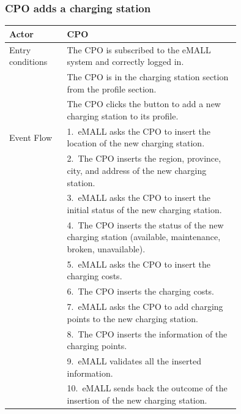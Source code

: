 \subsubsection*{CPO adds a charging station}
\begin{center}
    \begin{longtable}{lp{0.75\linewidth}}
        \hline
        Actor            & CPO                                                                                                       \\
        \hline
        Entry conditions & The CPO is subscribed to the eMALL system and correctly logged in.                                        \\
        & The CPO is in the charging station section from the profile section.                                      \\
        & The CPO clicks the button to add a new charging station to its profile.                                   \\
        \hline
        Event Flow       & 1.\ eMALL asks the CPO to insert the location of the new charging station.                                \\
        & 2.\ The CPO inserts the region, province, city, and address of the new charging station.                  \\
        & 3.\ eMALL asks the CPO to insert the initial status of the new charging station.                          \\
        & 4.\ The CPO inserts the status of the new charging station (available, maintenance, broken, unavailable). \\
        & 5.\ eMALL asks the CPO to insert the charging costs.                                                      \\
        & 6.\ The CPO inserts the charging costs.                                                                   \\
        & 7.\ eMALL asks the CPO to add charging points to the new charging station.                                \\
        & 8.\ The CPO inserts the information of the charging points.                                               \\
        & 9.\ eMALL validates all the inserted information.                                                         \\
        & 10.\ eMALL sends back the outcome of the insertion of the new charging station.                           \\

\end{longtable}
\end{center}
